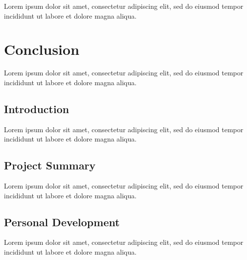 \documentclass[12pt, a4paper]{article}
\begin{document}


Lorem ipsum dolor sit amet, consectetur adipiscing elit, sed do eiusmod tempor incididunt ut labore et dolore magna aliqua.

\pagebreak


\section{Conclusion}

Lorem ipsum dolor sit amet, consectetur adipiscing elit, sed do eiusmod tempor incididunt ut labore et dolore magna aliqua.


\subsection{Introduction}

Lorem ipsum dolor sit amet, consectetur adipiscing elit, sed do eiusmod tempor incididunt ut labore et dolore magna aliqua.


\subsection{Project Summary}


Lorem ipsum dolor sit amet, consectetur adipiscing elit, sed do eiusmod tempor incididunt ut labore et dolore magna aliqua.


\subsection{Personal Development}

Lorem ipsum dolor sit amet, consectetur adipiscing elit, sed do eiusmod tempor incididunt ut labore et dolore magna aliqua.
\end{document}
